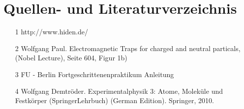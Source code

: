 \section{Quellen- und Literaturverzeichnis}
\begin{itemize}
\item [1] http://www.hiden.de/
\item [2] Wolfgang Paul. Electromagnetic Traps for charged and neutral particals,\\ (Nobel Lecture), Seite 604, Figur 1b)
\item [3] FU - Berlin Fortgeschrittenenpraktikum Anleitung
\item [4] Wolfgang Demtröder. Experimentalphysik 3: Atome, Moleküle und Festkörper (SpringerLehrbuch) (German Edition). Springer, 2010.
\end{itemize} 
